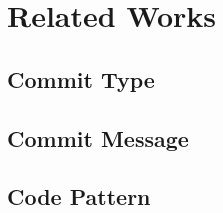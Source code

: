 \section{Related Works}
\subsection{Commit Type}
\subsection{Commit Message}
\subsection{Code Pattern}
\cite{Behnamghader_QRS}